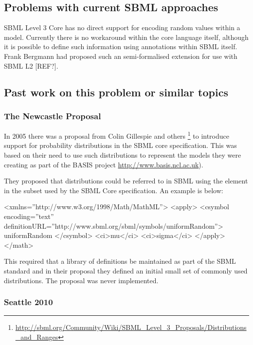 \documentclass[draftspec]{sbmlpkgspec}
\begin{document}
\subsection{Problems with current SBML approaches}

SBML Level 3 Core has no direct support for encoding random values
within a model. Currently there is no workaround within the core
language itself, although it is possible to define such information
using annotations within SBML itself. Frank Bergmann had proposed such
an semi-formalised extension for use with SBML L2 [REF?].

\subsection{Past work on this problem or similar topics}

\subsubsection{The Newcastle Proposal}
\label{sec:newcastle proposal}

In 2005 there was a proposal from Colin Gillespie and others
\footnote{\url{http://sbml.org/Community/Wiki/SBML_Level_3_Proposals/Distributions_and_Ranges}}
to introduce support for probability distributions in the SBML core specification. This
was based on their need to use such distributions to represent the
models they were creating as part of the BASIS project
\url{http://www.basis.ncl.ac.uk}).

They proposed that distributions could be referred to in SBML using
the  element in the \mathml subset used by
the SBML Core specification. An example is below:

\begin{example}
<xmlns=''http://www.w3.org/1998/Math/MathML''>
  <apply>
    <csymbol encoding=''text''
        definitionURL=''http://www.sbml.org/sbml/symbols/uniformRandom''>
      uniformRandom
    </csymbol>
    <ci>mu</ci>
    <ci>sigma</ci>
  </apply>
</math>
\end{example}

This required that a library of definitions be maintained as part of
the SBML standard and in their proposal they defined an initial small
set of commonly used distributions. The proposal was never
implemented.

\subsubsection{Seattle 2010}
\end{document}

